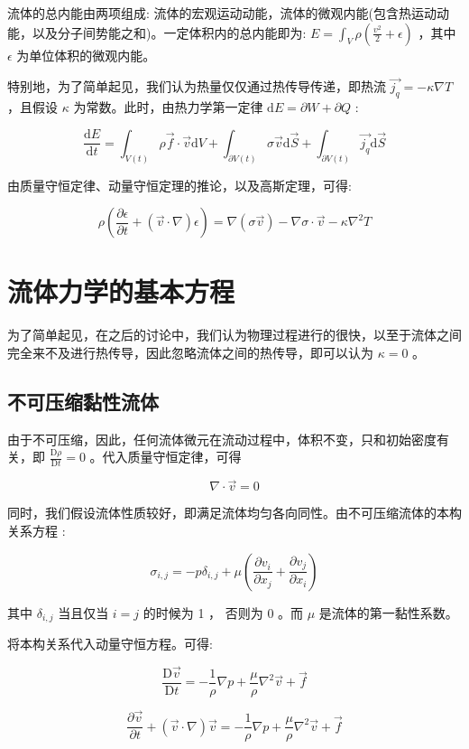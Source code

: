 \documentclass[fontset=windows]{article}
\newcommand{\upcite}[1]{\textsuperscript{\cite{#1}}}
\begin{document}
流体的总内能由两项组成: 流体的宏观运动动能，流体的微观内能(包含热运动动能，以及分子间势能之和)。一定体积内的总内能即为: $E = \int_V \rho(\frac{v ^ 2}{2} + \epsilon)$ ，其中 $\epsilon$ 为单位体积的微观内能。

特别地，为了简单起见，我们认为热量仅仅通过热传导传递，即热流 $ \vec{j_q} = -\kappa \nabla T$ ，且假设 $\kappa$ 为常数。此时，由热力学第一定律 $\mathrm{d}E = \partial W +  \partial Q$ :

$$
\frac{\mathrm{d}E}{\mathrm{d}t}
= \int_{V(t)} \rho \vec {f} \cdot \vec{v} \mathrm{d}V + \int_{\partial V(t)} \sigma \vec{v} \mathrm{d}\vec{S} + \int_{\partial V(t)} \vec{j_q} \mathrm{d}\vec{S} 
$$

由质量守恒定律、动量守恒定理的推论，以及高斯定理，可得:

$$
\rho(\frac{\partial \epsilon}{\partial t} + (\vec{v} \cdot \nabla) \epsilon) = \nabla (\sigma \vec {v}) - \nabla{\sigma} \cdot \vec{v} - \kappa \nabla^2{T}
$$

\section{流体力学的基本方程}

为了简单起见，在之后的讨论中，我们认为物理过程进行的很快，以至于流体之间完全来不及进行热传导，因此忽略流体之间的热传导，即可以认为 $\kappa = 0$ 。

\subsection{不可压缩黏性流体}

由于不可压缩，因此，任何流体微元在流动过程中，体积不变，只和初始密度有关，即 $\frac{\mathrm{D}\rho}{\mathrm{D}t} = 0$ 。代入质量守恒定律，可得 

$$
\nabla \cdot \vec{v} = 0
$$

同时，我们假设流体性质较好，即满足流体均匀各向同性。由不可压缩流体的本构关系方程 \upcite{ref3} :

$$
\sigma_{i,j} = -p\delta_{i,j} + \mu(\frac{\partial v_i}{\partial x_j} + \frac{\partial v_j}{\partial x_i})
$$

其中 $\delta_{i,j}$ 当且仅当 $i = j$ 的时候为 1 ， 否则为 0 。而 $\mu$ 是流体的第一黏性系数。

将本构关系代入动量守恒方程。可得:

$$ 
\frac{\mathrm{D}\vec{v}}{\mathrm{D}t} = -\frac{1}{\rho}\nabla{p} + \frac{\mu}{\rho}\nabla^2{\vec{v}} + \vec{f}
$$

$$ 
\frac{\partial \vec{v}}{\partial t} + (\vec{v} \cdot \nabla) \vec{v}  = -\frac{1}{\rho}\nabla{p} + \frac{\mu}{\rho}\nabla^2{\vec{v}} + \vec{f}
$$
\end{document}
